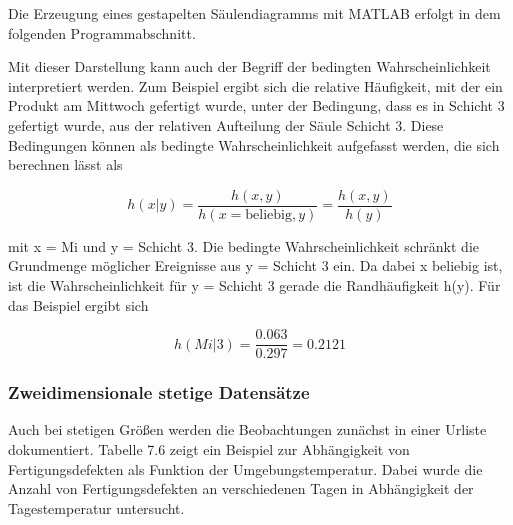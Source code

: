 \noindent Die Erzeugung eines gestapelten S\"{a}ulendiagramms mit MATLAB erfolgt in dem folgenden Programmabschnitt.



\noindent Mit dieser Darstellung kann auch der Begriff der bedingten Wahrscheinlichkeit interpretiert werden. Zum Beispiel ergibt sich die relative H\"{a}ufigkeit, mit der ein Produkt am Mittwoch gefertigt wurde, unter der Bedingung, dass es in Schicht 3 gefertigt wurde, aus der relativen Aufteilung der S\"{a}ule Schicht 3. Diese Bedingungen k\"{o}nnen als bedingte Wahrscheinlichkeit aufgefasst werden, die sich berechnen l\"{a}sst als

\begin{equation}\label{eq:sevenseven}
h(x|y)=\dfrac{h(x,y)}{h(x=\text{beliebig},y)} =\dfrac{h(x,y)}{h(y)}
\end{equation}

\noindent mit x = Mi und y = Schicht 3. Die bedingte Wahrscheinlichkeit schr\"{a}nkt die Grundmenge m\"{o}glicher Ereignisse aus y = Schicht 3 ein. Da dabei x beliebig ist, ist die Wahrscheinlichkeit f\"{u}r y = Schicht 3 gerade die Randh\"{a}ufigkeit h(y). F\"{u}r das Beispiel ergibt sich

\begin{equation}\label{eq:seveneight}
h(Mi|3)=\dfrac{0.063}{0.297} =0.2121
\end{equation}

\clearpage

\subsubsection{Zweidimensionale stetige Datens\"{a}tze}

\noindent Auch bei stetigen Gr\"{o}{\ss}en werden die Beobachtungen zun\"{a}chst in einer Urliste dokumentiert. Tabelle 7.6 zeigt ein Beispiel zur Abh\"{a}ngigkeit von Fertigungsdefekten als Funktion der Umgebungstemperatur. Dabei wurde die Anzahl von Fertigungsdefekten an verschiedenen Tagen in Abh\"{a}ngigkeit der Tagestemperatur untersucht.

